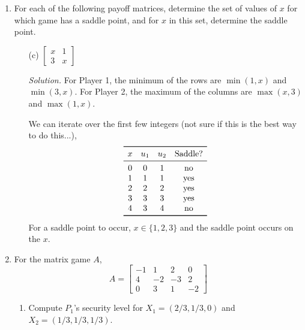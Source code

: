 \documentclass{homework}
\newcommand{\solution}{	\vspace{1em} \textit{Solution.} \quad }
\newcommand{\bolditem}[1][YYY]{\item[\textbf{#1}]}
\begin{document}
\begin{enumerate}
		\bolditem[9.3.2] For each of the following payoff matrices, determine the set of values of $x$ for which game has a saddle point, and for $x$ in this set, determine the saddle point. \begin{enumerate}
			\item[(c)] $\begin{bmatrix}
				x & 1 \\
				3 & x
			\end{bmatrix}$
			
			\solution For Player 1, the minimum of the rows are $\min(1, x)$ and $\min(3, x)$. For Player 2, the maximum of the columns are $\max(x, 3)$ and $\max(1, x)$. 
			
			We can iterate over the first few integers (not sure if this is the best way to do this...),
				$$\begin{array}{cccc}
					\toprule
					x & u_1 & u_2 & \text{Saddle?}\\
					\midrule
					0 & 0 & 1 & \text{no} \\
					1 & 1 & 1 & \text{yes} \\
					2 & 2 & 2 & \text{yes} \\
					3 & 3 & 3 & \text{yes} \\
					4 & 3 & 4 & \text{no} \\
					\bottomrule
				\end{array}$$
			For a saddle point to occur, $x \in \{1, 2, 3\}$ and the saddle point occurs on the $x$.
		\end{enumerate}
		
		\bolditem[9.4.2] For the matrix game $A$, $$A = \begin{bmatrix}
			-1 & 1 & 2 & 0 \\
			4 & -2 & -3 & 2 \\
			0 & 3 & 1 & -2
		\end{bmatrix}$$
		
		\begin{enumerate}
			\item Compute $P_1$'s security level for $X_1=(2/3, 1/3, 0)$ and $X_2=(1/3, 1/3, 1/3)$.
			

\end{enumerate}
\end{enumerate}
\end{document}

